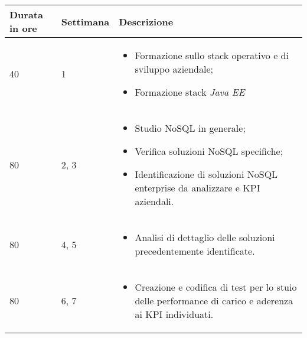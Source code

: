 \begin{center}

        \renewcommand{\arraystretch}{1.5}
    
        \centering
        \begin{longtable}{| C{2.5cm} | C{2cm} | L{7.2cm} | }
            
            \hline
            
            \textbf{Durata in ore} & \textbf{Settimana} & \textbf{Descrizione} \\
            
            \hline
            
            40 & 1 &
            \begin{itemize}[leftmargin=*]
                \item Formazione sullo stack operativo e di sviluppo aziendale;
                \item Formazione stack \textit{Java EE}
            \end{itemize} \\
            
            \hline
            
            80 & 2, 3 &
            \begin{itemize}[leftmargin=*]
                \item Studio NoSQL in generale;
                \item Verifica soluzioni NoSQL specifiche;
                \item Identificazione di soluzioni NoSQL enterprise da analizzare e \gls{KPI} aziendali. 
            \end{itemize}  \\
            
            \hline
        
            
            80 & 4, 5 &
            \begin{itemize}[leftmargin=*]
                \item Analisi di dettaglio delle soluzioni precedentemente identificate. 
            \end{itemize}  \\
             
            \hline
            
            80 & 6, 7 &
            \begin{itemize}[leftmargin=*]
                \item Creazione e codifica di test per lo stuio delle performance di carico e aderenza ai \gls{KPI} individuati.
            \end{itemize}  \\
            

\end{longtable}
\end{center}
